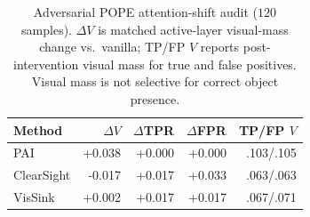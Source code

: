 \begin{table}[t]
\centering
\scriptsize
\setlength{\tabcolsep}{3.1pt}
\begin{tabular}{lrrrr}
\toprule
Method & $\Delta V$ & $\Delta$TPR & $\Delta$FPR & TP/FP $V$ \\
\midrule
PAI & +0.038 & +0.000 & +0.000 & .103/.105 \\
ClearSight & -0.017 & +0.017 & +0.033 & .063/.063 \\
VisSink & +0.002 & +0.017 & +0.017 & .067/.071 \\
\bottomrule
\end{tabular}
\caption{Adversarial POPE attention-shift audit ($120$ samples). $\Delta V$ is matched active-layer visual-mass change vs.\ vanilla; TP/FP $V$ reports post-intervention visual mass for true and false positives. Visual mass is not selective for correct object presence.}
\label{tab:attention-audit}
\end{table}
